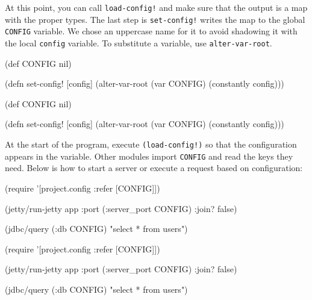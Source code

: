 At this point, you can call \verb|load-config!| and make sure that the output is
a map with the proper types. The last step is \verb|set-config!| writes the map
to the global \verb|CONFIG| variable. We chose an uppercase name for it to avoid
shadowing it with the local \verb|config| variable. To substitute a variable,
use \verb|alter-var-root|.


\ifx\DEVICETYPE\MOBILE

\begin{english}
  \begin{clojure}
(def CONFIG nil)

(defn set-config!
  [config]
  (alter-var-root (var CONFIG)
    (constantly config)))
  \end{clojure}
\end{english}

\else

\begin{english}
  \begin{clojure}
(def CONFIG nil)

(defn set-config!
  [config]
  (alter-var-root (var CONFIG) (constantly config)))
  \end{clojure}
\end{english}

\fi

At the start of the program, execute \texttt{(load-config!)} so that the configuration appears in the variable. Other modules import \verb|CONFIG| and read the keys they need. Below is how to start a server or execute a request based on configuration:


\ifx\DEVICETYPE\MOBILE

\begin{english}
  \begin{clojure}
(require
  '[project.config :refer [CONFIG]])

(jetty/run-jetty app
  {:port (:server_port CONFIG)
   :join? false})

(jdbc/query (:db CONFIG)
  "select * from users")
  \end{clojure}
\end{english}

\else

\begin{english}
  \begin{clojure}
(require '[project.config :refer [CONFIG]])

(jetty/run-jetty app {:port (:server_port CONFIG)
                      :join? false})

(jdbc/query (:db CONFIG) "select * from users")
  \end{clojure}
\end{english}


